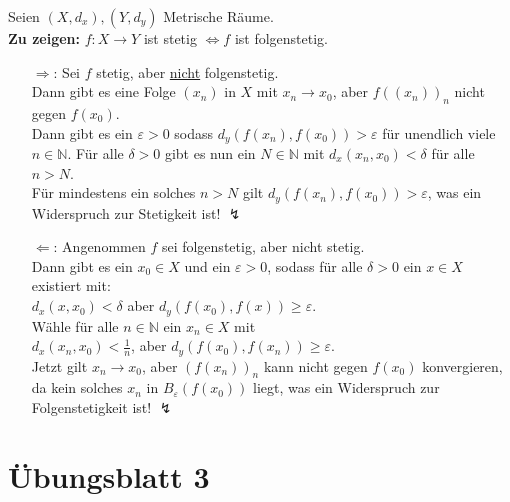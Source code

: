 \begin{problem}[2]
  Seien \( (X,d_x), (Y,d_y) \) Metrische Räume. \\
  \textbf{Zu zeigen:} \( f: X \to Y \) ist stetig \( \Leftrightarrow f \) ist folgenstetig.
  \begin{itemize}
    \item[\( \Rightarrow \):] Sei \( f \) stetig, aber \underline{nicht} folgenstetig. \\
    Dann gibt es eine Folge \( (x_n) \) in \( X \) mit \( x_n \to x_0 \), aber \( {f((x_n))}_n \) nicht gegen \( f(x_0) \). \\
    Dann gibt es ein \( \varepsilon > 0 \) sodass \( d_y(f(x_n),f(x_0)) > \varepsilon \) für unendlich viele \( n \in \mathbb{N} \). Für alle \( \delta > 0 \) gibt es nun ein \( N \in \mathbb{N} \) mit \( d_x(x_n,x_0) < \delta \) für alle \( n > N \). \\
    Für mindestens ein solches \( n > N \) gilt \( d_y(f(x_n),f(x_0)) > \varepsilon \), was ein Widerspruch zur Stetigkeit ist! \( \lightning \)
    
    \item[\( \Leftarrow \):] Angenommen \( f \) sei folgenstetig, aber nicht stetig. \\
    Dann gibt es ein \( x_0 \in X \) und ein \( \varepsilon > 0 \), sodass für alle \( \delta > 0 \) ein \( x \in X \) existiert mit: \\
    \( d_x(x,x_0) < \delta \) aber \( d_y(f(x_0),f(x)) \geq \varepsilon \). \\
    Wähle für alle \( n \in \mathbb{N} \) ein \( x_n \in X \) mit\\
    \( d_x(x_n,x_0) < \frac{1}{n} \), aber \( d_y(f(x_0), f(x_n)) \geq \varepsilon \). \\
    Jetzt gilt \( x_n \to x_0 \), aber \( {(f(x_n))}_n \) kann nicht gegen \( f(x_0) \) konvergieren, da kein solches \( x_n \) in \( B_{\varepsilon}(f(x_0)) \) liegt, was ein Widerspruch zur Folgenstetigkeit ist! \( \lightning \)
  \end{itemize}
\end{problem}



% 
\section{Übungsblatt 3}

